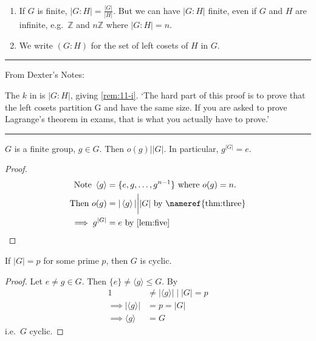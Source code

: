 \begin{remark} ~
    \begin{enumerate}
    \def\labelenumi{\roman{enumi}.}
    \item
    If $G$ is finite, $|G : H| = \frac{|G|}{|H|}$.
    But we can have $|G : H|$ finite, even if $G$ and $H$ are infinite, e.g.~$\mathbb{Z}$ and $n\mathbb{Z}$ where $|G : H| = n$. \label{rem:11-i}
    \item
    We write $(G : H)$ for the set of left cosets of $H$ in $G$.
    \end{enumerate}
\end{remark}

\begin{center}\rule{\linewidth}{0.5pt}\end{center}
From Dexter's Notes:

The $k$ in  is $| G : H |$, giving \cref{rem:11-i}.
`The hard part of this proof is to prove that the left cosets partition G
and have the same size. 
If you are asked to prove Lagrange’s theorem in exams,
that is what you actually have to prove.'
\begin{center}\rule{\linewidth}{0.5pt}\end{center}

\begin{corollary}
\protect\hypertarget{cor:two}{}\label{cor:two}
$G$ is a finite group, $g \in G$.
Then $o(g) \bigg| |G|$.
In particular, $g^{|G|} = e$.
\end{corollary}

\begin{proof}
\begin{align*}
    \text{Note } \left\langle g\right\rangle &= \{ e, g, \ldots, g^{n-1} \} \text{ where } o(g) = n. \\
    \text{Then } o(g) &= | \left\langle g\right\rangle | \bigg| |G| \text{ by \nameref{thm:three}} \\
    \implies g^{|G|} &= e \text{ by \Cref{lem:five}}
\end{align*}
\end{proof}

\begin{corollary}
\protect\hypertarget{cor:three}{}\label{cor:three}
If $|G| = p$ for some prime $p$, then $G$ is cyclic.
\end{corollary}

\begin{proof}
Let $e \neq g \in G$.
Then $\{ e \} \neq \langle g \rangle \leq G$.
By 
\begin{align*}
    1 &\neq | \langle g \rangle | \;\bigg|\; |G| = p \\
    \implies | \langle g \rangle | &= p = |G| \\
    \implies \langle g \rangle &= G
\end{align*}
i.e.~$G$ cyclic.
\end{proof}


